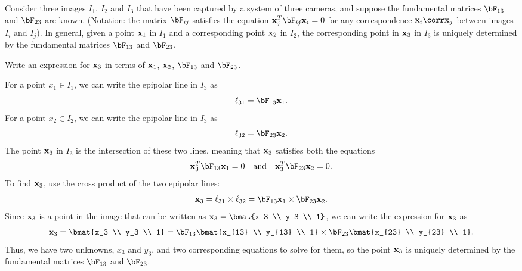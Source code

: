 \begin{problem}
  Consider three images $I_1$, $I_2$ and $I_3$ that have been captured
  by a system of three cameras, and suppose the fundamental matrices
  $\bF_{13}$ and $\bF_{23}$ are known. (Notation: the matrix $\bF_{ij}$ satisfies the
  equation $\bx_j^T \bF_{ij} \bx_i = 0$ for any correspondence
  $\bx_i \corr \bx_j$ between images $I_i$ and $I_j$).
  In general, given a point $\mathbf{x}_1$ in $I_1$ and a corresponding point $\mathbf{x}_2$ in $I_2$,
  the corresponding point in $\mathbf{x}_3$ in $I_3$ is uniquely determined
  by the fundamental matrices $\bF_{13}$ and $\bF_{23}$.

  \begin{enumroman}
    \item Write an expression for $\mathbf{x}_3$ in terms of $\mathbf{x}_1$, $\mathbf{x}_2$, $\bF_{13}$ and $\bF_{23}$.
      \begin{answer}
        For a point $x_1 \in I_1$, we can write the epipolar line in $I_3$ as
        \[
          \ell_{31} = \bF_{13} \bx_1.
        \]
        For a point $x_2 \in I_2$, we can write the epipolar line in $I_3$ as
        \[
          \ell_{32} = \bF_{23} \bx_2.
        \]
        The point $\mathbf{x}_3$ in $I_3$ is the intersection of these two lines, 
        meaning that $\mathbf{x}_3$ satisfies both the equations
        \[
          \bx_3^T \bF_{13} \bx_1 = 0 \quad \text{and} \quad \bx_3^T \bF_{23} \bx_2 = 0.
        \]
        To find $\mathbf{x}_3$, use the cross product of the two epipolar lines:
        \[
          \bx_3 = \ell_{31} \times \ell_{32} = \bF_{13}\bx_1 \times \bF_{23} \bx_{2}.
        \]
        Since $\mathbf{x}_3$ is a point in the image that can be written as
        $\bx_3 = \bmat{x_3 \\ y_3 \\ 1}$, we can write the expression for $\mathbf{x}_3$ as
        \[
          \bx_3 = \bmat{x_3 \\ y_3 \\ 1} =
          \bF_{13}\bmat{x_{13} \\ y_{13} \\ 1} \times
          \bF_{23} \bmat{x_{23} \\ y_{23} \\ 1}.
        \]
        Thus, we have two unknowns, $x_3$ and $y_3$, and two corresponding equations to solve for them,
        so the point $\mathbf{x}_3$ is uniquely determined by the fundamental matrices $\bF_{13}$ and $\bF_{23}$.

      \end{answer}


\end{enumroman}
\end{problem}
